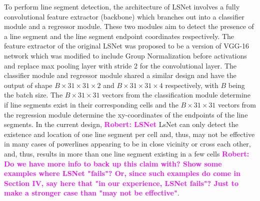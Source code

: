 \documentclass[journal]{IEEEtran}
\newcommand{\commentR}[1]{\textbf{\textcolor{magenta}{Robert: #1}}}
\begin{document}
To perform line segment detection, the architecture of LSNet involves a fully convolutional feature extractor (backbone) which branches out into a classifier module and a regressor module. These two modules aim to detect the presence of a line segment and the line segment endpoint coordinates respectively. The feature extractor of the original LSNet was proposed to be a version of VGG-16 network \cite{vgg} which was modified to include Group Normalization \cite{group_norm} before activations and replace max pooling layer with stride 2 for the convolutional layer. The classifier module and regressor module shared a similar design and have the output of shape $B \times 31 \times 31 \times 2$ and $B \times 31 \times 31 \times 4$ respectively, with $B$ being the batch size. The $B \times 31 \times 31$ vectors from the classification module determine if line segments exist in their corresponding cells and the $B \times 31 \times 31$ vectors from the regression module determine the xy-coordinates of the endpoints of the line segments. In the current design, \commentR{LSNet} LsNet can only detect the existence and location of one line segment per cell and, thus, may not be effective in many cases of powerlines appearing to be in close vicinity or cross each other, and, thus, results in more than one line segment existing in a few cells \commentR{Do we have more info to back up this claim with? Show some examples where LSNet "fails"? Or, since such examples do come in Section IV, say here that "in our experience, LSNet fails"? Just to make a stronger case than "may not be effective"}.
\end{document}
